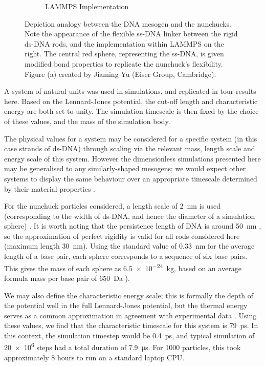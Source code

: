 \documentclass[11pt, a4paper]{article} %
\begin{document}
\begin{figure}[ht]
\begin{subfigure}{.4\textwidth}
		\caption{LAMMPS Implementation}
		\label{fig:nunchuck_implementation}
	\end{subfigure}
	\caption{Depiction analogy between the DNA mesogen and the nunchucks. Note the appearance of the flexible ss-DNA linker between the rigid ds-DNA rods, and the implementation within LAMMPS on the right. The central red sphere, representing the ss-DNA, is given modified bond properties to replicate the nunchuck's flexibility. Figure (a) created by Jiaming Yu (Eiser Group, Cambridge).}
	\label{fig:nunchucks_visual}
	\hfill
\end{figure}

A system of natural units was used in simulations, and replicated in tour results here. Based on the Lennard-Jones potential, the cut-off length and characteristic energy are both set to unity. The simulation timescale is then fixed by the choice of these values, and the mass of the simulation body. 

The physical values for a system may be considered for a specific system (in this case strands of ds-DNA) through scaling via the relevant mass, length scale and energy scale of this system. However the dimensionless simulations presented here may be generalised to any similarly-shaped mesogens; we would expect other systems to display the same behaviour over an appropriate timescale determined by their material properties \cite{Rapaport2004}.

For the nunchuck particles considered, a length scale of \SI{2}{\nano\metre} is used (corresponding to the width of ds-DNA, and hence the diameter of a simulation sphere) \cite{Arnott1972}. It is worth noting that the persistence length of DNA is around \SI{50}{\nano\metre} \cite{Garcia2007}, so the approximation of perfect rigidity is valid for all rods considered here (maximum length \SI{30}{\nano\metre}). Using the standard value of \SI{0.33}{\nano\metre} \cite{Langridge1960} for the average length of a base pair, each sphere corresponds to a sequence of six base pairs. This gives the mass of each sphere as \SI{6.5e-24}{\kilogram}, based on an average formula mass per base pair of \SI{650}{\dalton} \cite{Duewer2018}). 

We may also define the characteristic energy scale; this is formally the depth of the potential well in the full Lennard-Jones potential, but the thermal energy serves as a common approximation \cite{Pan2010} in agreement with experimental data \cite{Wang2002}. Using these values, we find that the characteristic timescale for this system is \SI{79}{\pico\second}. In this context, the simulation timestep would be \SI{0.4}{\pico\second}, and typical simulation of \num{20e6} steps had a total duration of \SI{7.9}{\micro\second}. For \num{1000} particles, this took approximately $8$ hours to run on a standard laptop CPU. %
\end{document}
